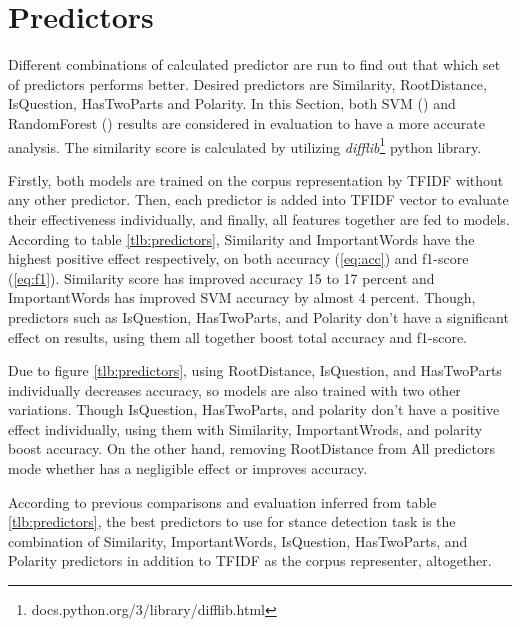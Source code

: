 \section{Predictors}
\label{sec:predictors}
Different combinations of calculated predictor are run to find out that which set of predictors performs better. Desired predictors are Similarity, RootDistance, IsQuestion, HasTwoParts and Polarity. In this Section, both \ac{SVM} (\cite{svc}) and RandomForest (\cite{randomforest}) results are considered in evaluation to have a more accurate analysis. The similarity score is calculated by utilizing \textit{difflib}\footnote{docs.python.org/3/library/difflib.html} python library.


Firstly, both models are trained on the corpus representation by \ac{TFIDF} without any other predictor. Then, each predictor is added into \ac{TFIDF} vector to evaluate their effectiveness individually, and finally, all features together are fed to models. According to table \ref{tlb:predictors}, Similarity and ImportantWords have the highest positive effect respectively, on both accuracy (\ref{eq:acc}) and f1-score (\ref{eq:f1}). Similarity score has improved accuracy 15 to 17 percent and ImportantWords has improved \ac{SVM} accuracy by almost 4 percent. Though, predictors such as IsQuestion, HasTwoParts, and Polarity don't have a significant effect on results, using them all together boost total accuracy and f1-score. 

Due to figure \ref{tlb:predictors}, using RootDistance, IsQuestion, and HasTwoParts individually decreases accuracy, so models are also trained with two other variations. Though IsQuestion, HasTwoParts, and polarity don't have a positive effect individually, using them with Similarity, ImportantWrods, and polarity boost accuracy. On the other hand, removing RootDistance from All predictors mode whether has a negligible effect or improves accuracy. 

According to previous comparisons and evaluation inferred from table \ref{tlb:predictors}, the best predictors to use for stance detection task is the combination of Similarity, ImportantWords, IsQuestion, HasTwoParts, and Polarity predictors in addition to \ac{TFIDF} as the corpus representer, altogether.

